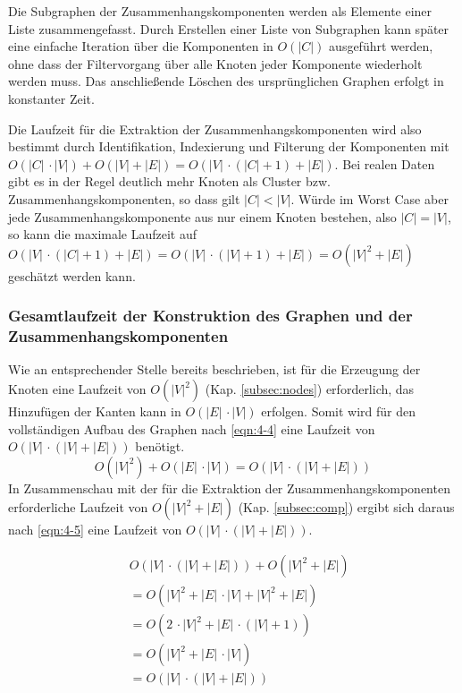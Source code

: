 Die Subgraphen der Zusammenhangskomponenten werden als Elemente einer Liste zusammengefasst. Durch Erstellen einer Liste von Subgraphen kann später eine einfache Iteration über die Komponenten in $ O(|C|) $ ausgeführt werden, ohne dass der Filtervorgang über alle Knoten jeder Komponente wiederholt werden muss. 
Das anschließende Löschen des ursprünglichen Graphen erfolgt in konstanter Zeit.

Die Laufzeit für die Extraktion der Zusammenhangskomponenten wird also bestimmt durch Identifikation, Indexierung und Filterung der Komponenten mit $ O(|C| \, \cdotp |V|) + O(|V| + |E|) = O(|V| \, \cdotp (|C| + 1) +|E|)$. Bei realen Daten gibt es in der Regel deutlich mehr Knoten als Cluster bzw. Zusammenhangskomponenten, so dass gilt $ |C| < |V| $. Würde im Worst Case aber jede Zusammenhangskomponente aus nur einem Knoten bestehen, also $ |C| = |V| $, so kann die maximale Laufzeit auf $ O(|V| \, \cdotp (|C| + 1) +|E|) = O(|V| \, \cdotp (|V| + 1) + |E|) = O(|V|^2 + |E|) $ geschätzt werden kann.\\

\subsubsection{Gesamtlaufzeit der Konstruktion des Graphen und der Zusammenhangskomponenten} \label{subsec:graph_compl}
Wie an entsprechender Stelle bereits beschrieben, ist für die Erzeugung der Knoten eine Laufzeit von $ O(|V|^2) $ (Kap. \ref{subsec:nodes}) erforderlich, das Hinzufügen der Kanten kann in $ O(|E|\, \cdotp |V|) $ erfolgen. Somit wird für den vollständigen Aufbau des Graphen nach \eqref{eqn:4-4} eine Laufzeit von $ O(|V| \, \cdotp (|V|+|E|)) $ benötigt. \\
\begin{equation} \label{eqn:4-4}
\tag{4-4}
O(|V|^2) + O(|E|\, \cdotp |V|) = O(|V| \, \cdotp (|V|+|E|))
\end{equation}
In Zusammenschau mit der für die Extraktion der Zusammenhangskomponenten erforderliche Laufzeit von $ O(|V|^2 + |E|) $ (Kap. \ref{subsec:comp}) ergibt sich daraus nach  \eqref{eqn:4-5} eine Laufzeit von $ O(|V| \, \cdotp (|V| + |E|)) $. 

\begin{equation} \label{eqn:4-5}
\tag{4-5}
\begin{aligned}
&\ {} O(|V| \, \cdotp (|V|+|E|)) +O(|V|^2 + |E|) \\
& \ = O(|V|^2 + |E| \, \cdotp |V| + |V|^2 + |E|)\\
&\ = O(2 \, \cdotp |V|^2 + |E| \, \cdotp (|V| + 1)) \\
&\ = O(|V|^2 + |E| \, \cdotp |V|)\\
&\ = O(|V| \, \cdotp (|V| + |E|))\\
\end{aligned}
\end{equation}


